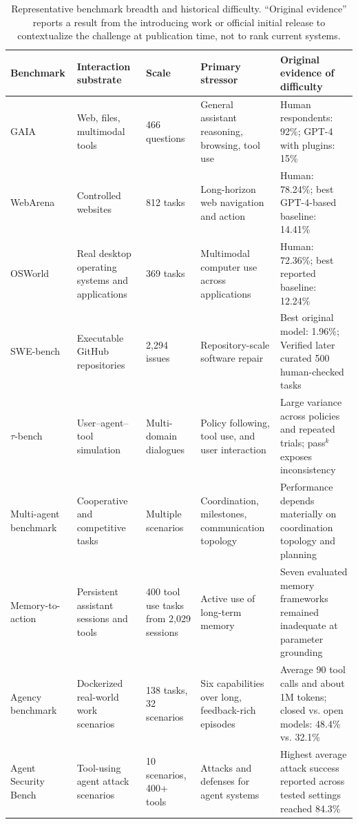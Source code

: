 \begin{table}[H]
\centering
\caption{Representative benchmark breadth and historical difficulty. ``Original evidence'' reports a result from the introducing work or official initial release to contextualize the challenge at publication time, not to rank current systems.}
\label{tab:agent-benchmarks}
\scriptsize
\surveytableformat
\begin{tabularx}{\textwidth}{L{2.1cm}L{2.05cm}L{1.35cm}Y Y}
\toprule
{}\textbf{Benchmark} & \textbf{Interaction substrate} & \textbf{Scale} & \textbf{Primary stressor} & \textbf{Original evidence of difficulty} \\
\midrule
GAIA~\cite{mialon2024gaia} & Web, files, multimodal tools & 466 questions & General assistant reasoning, browsing, tool use & Human respondents: 92\%; GPT-4 with plugins: 15\% \\
WebArena~\cite{zhou2024webarena} & Controlled websites & 812 tasks & Long-horizon web navigation and action & Human: 78.24\%; best GPT-4-based baseline: 14.41\% \\
OSWorld~\cite{xie2024osworld} & Real desktop operating systems and applications & 369 tasks & Multimodal computer use across applications & Human: 72.36\%; best reported baseline: 12.24\% \\
SWE-bench~\cite{jimenez2024swebench} & Executable GitHub repositories & 2,294 issues & Repository-scale software repair & Best original model: 1.96\%; Verified later curated 500 human-checked tasks \\
$\tau$-bench~\cite{yao2024taubench} & User--agent--tool simulation & Multi-domain dialogues & Policy following, tool use, and user interaction & Large variance across policies and repeated trials; pass$^k$ exposes inconsistency \\
Multi-agent benchmark~\cite{zhu2025multiagentbench} & Cooperative and competitive tasks & Multiple scenarios & Coordination, milestones, communication topology & Performance depends materially on coordination topology and planning \\
Memory-to-action~\cite{shen2026mem2actbench} & Persistent assistant sessions and tools & 400 tool use tasks from 2,029 sessions & Active use of long-term memory & Seven evaluated memory frameworks remained inadequate at parameter grounding \\
Agency benchmark~\cite{li2026agencybench} & Dockerized real-world work scenarios & 138 tasks, 32 scenarios & Six capabilities over long, feedback-rich episodes & Average 90 tool calls and about 1M tokens; closed vs. open models: 48.4\% vs. 32.1\% \\
Agent Security Bench~\cite{zhang2024agentsecuritybench} & Tool-using agent attack scenarios & 10 scenarios, 400+ tools & Attacks and defenses for agent systems & Highest average attack success reported across tested settings reached 84.3\% \\
\bottomrule
\end{tabularx}
\end{table}


